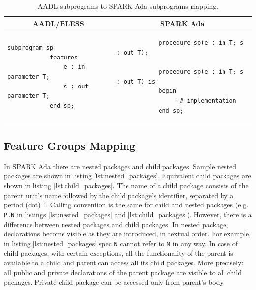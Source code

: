 \singlespacing
\begin{table}[!ht]
	\caption{AADL subprograms to SPARK Ada subprograms mapping.}
	\label{table:subprograms_mapping}
	\centering
  	\begin{tabular}{ | p{3in} | p{3in} |}

		\hline
		\multicolumn{1}{|c|}{\textbf{AADL/BLESS}} & \multicolumn{1}{|c|}{\textbf{SPARK Ada}} \\ \hline

		\begin{lstlisting}[language=aadl]
			subprogram sp
			features
				e : in parameter T;
				s : out parameter T;
			end sp;
		\end{lstlisting} 
		& 
		\begin{lstlisting}
			procedure sp(e : in T; s : out T);

			procedure sp(e : in T; s : out T) is 
			begin
				--# implementation
			end sp;
		\end{lstlisting} 		

		\\ \hline
	\end{tabular}
\end{table}
\doublespacing


\subsection{Feature Groups Mapping}
\label{codegen:mapping:feature_groups}

In SPARK Ada there are nested packages and child packages. Sample nested packages are shown in listing \ref{lst:nested_packages}. Equivalent child packages are shown in listing \ref{lst:child_packages}. The name of a child package consists of the parent unit's name followed by the child package's identifier, separated by a period (dot) '.'. Calling convention is the same for child and nested packages (e.g. \lstinline{P.N} in listings \ref{lst:nested_packages} and \ref{lst:child_packages}). However, there is a difference between nested packages and child packages. In nested package, declarations become visible as they are introduced, in textual order. For example, in listing \ref{lst:nested_packages} spec \lstinline{N} cannot refer to \lstinline{M} in any way. In case of child packages, with certain exceptions, all the functionality of the parent is available to a child and parent can access all its child packages. More precisely: all public and private declarations of the parent package are visible to all child packages. Private child package can be accessed only from parent's body.

